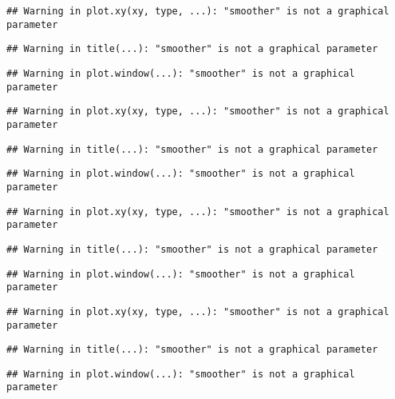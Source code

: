 \documentclass[
]{article}
\begin{document}
\begin{verbatim}
## Warning in plot.xy(xy, type, ...): "smoother" is not a graphical parameter
\end{verbatim}

\begin{verbatim}
## Warning in title(...): "smoother" is not a graphical parameter
\end{verbatim}

\begin{verbatim}
## Warning in plot.window(...): "smoother" is not a graphical parameter
\end{verbatim}

\begin{verbatim}
## Warning in plot.xy(xy, type, ...): "smoother" is not a graphical parameter
\end{verbatim}

\begin{verbatim}
## Warning in title(...): "smoother" is not a graphical parameter
\end{verbatim}

\begin{verbatim}
## Warning in plot.window(...): "smoother" is not a graphical parameter
\end{verbatim}

\begin{verbatim}
## Warning in plot.xy(xy, type, ...): "smoother" is not a graphical parameter
\end{verbatim}

\begin{verbatim}
## Warning in title(...): "smoother" is not a graphical parameter
\end{verbatim}

\begin{verbatim}
## Warning in plot.window(...): "smoother" is not a graphical parameter
\end{verbatim}

\begin{verbatim}
## Warning in plot.xy(xy, type, ...): "smoother" is not a graphical parameter
\end{verbatim}

\begin{verbatim}
## Warning in title(...): "smoother" is not a graphical parameter
\end{verbatim}

\begin{verbatim}
## Warning in plot.window(...): "smoother" is not a graphical parameter
\end{verbatim}
\end{document}
